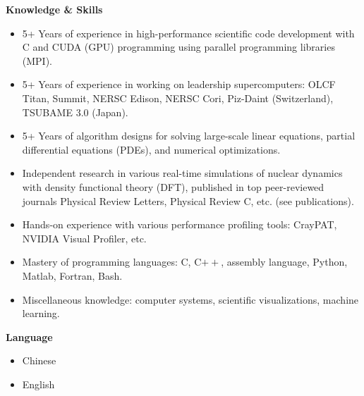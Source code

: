 \documentclass[letterpaper,12pt]{article}
\newcommand{\resheading}[1]{{\large \colorbox{mygrey}{\begin{minipage}{\textwidth}{\textbf{#1 \vphantom{p\^{E}}}}\end{minipage}}}}
\begin{document}
				


\resheading{Knowledge \& Skills}
\begin{itemize}
\itemsep0em
	\item
	5+ Years of experience in high-performance scientific code development with C and CUDA (GPU) programming using parallel programming libraries (MPI).
	\item 
	5+ Years of experience in working on leadership supercomputers: OLCF Titan, Summit, NERSC Edison, NERSC Cori, Piz-Daint (Switzerland), TSUBAME 3.0 (Japan).
	\item
	5+ Years of algorithm designs for solving large-scale linear equations, partial differential equations (PDEs), and numerical optimizations.
	\item
	Independent research in various real-time simulations of nuclear dynamics with density functional theory (DFT), published in top peer-reviewed journals Physical Review Letters, Physical Review C, etc. (see publications).
	\item
	Hands-on experience with various performance profiling tools: CrayPAT, NVIDIA Visual Profiler, etc.
	\item
	Mastery of programming languages: C, C$++$, assembly language, Python, Matlab, Fortran, Bash.
	
	\item	
	Miscellaneous knowledge: computer systems, scientific visualizations, machine learning.
	
	
	
\end{itemize}

\resheading{Language}
\begin{itemize}
\item
Chinese 
\item
English 
\end{itemize}


\end{document}
